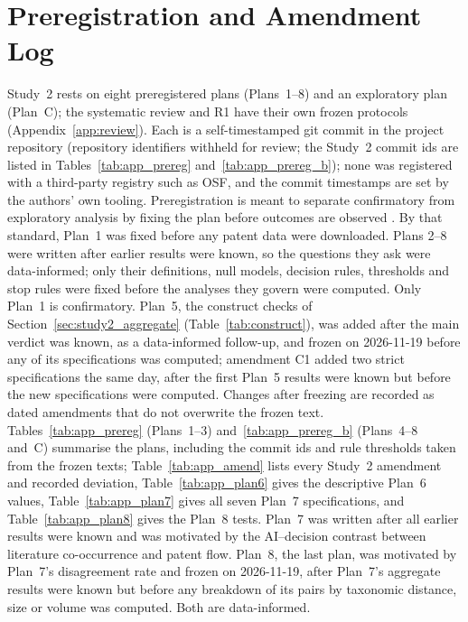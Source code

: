 
\section{Preregistration and Amendment Log}
\label{app:prereg}

Study~2 rests on eight preregistered plans (Plans~1--8) and an exploratory plan (Plan~C); the systematic review and R1 have their own frozen protocols (Appendix~\ref{app:review}). Each is a self-timestamped git commit in the project repository (repository identifiers withheld for review; the Study~2 commit ids are listed in Tables~\ref{tab:app_prereg} and~\ref{tab:app_prereg_b}); none was registered with a third-party registry such as OSF, and the commit timestamps are set by the authors' own tooling. Preregistration is meant to separate confirmatory from exploratory analysis by fixing the plan before outcomes are observed \citep{nosek2018preregistration}. By that standard, Plan~1 was fixed before any patent data were downloaded. Plans 2--8 were written after earlier results were known, so the questions they ask were data-informed; only their definitions, null models, decision rules, thresholds and stop rules were fixed before the analyses they govern were computed. Only Plan~1 is confirmatory. Plan~5, the construct checks of Section~\ref{sec:study2_aggregate} (Table~\ref{tab:construct}), was added after the main verdict was known, as a data-informed follow-up, and frozen on 2026-11-19 before any of its specifications was computed; amendment C1 added two strict specifications the same day, after the first Plan~5 results were known but before the new specifications were computed. Changes after freezing are recorded as dated amendments that do not overwrite the frozen text. Tables~\ref{tab:app_prereg} (Plans~1--3) and~\ref{tab:app_prereg_b} (Plans~4--8 and~C) summarise the plans, including the commit ids and rule thresholds taken from the frozen texts; Table~\ref{tab:app_amend} lists every Study~2 amendment and recorded deviation, Table~\ref{tab:app_plan6} gives the descriptive Plan~6 values, Table~\ref{tab:app_plan7} gives all seven Plan~7 specifications, and Table~\ref{tab:app_plan8} gives the Plan~8 tests. Plan~7 was written after all earlier results were known and was motivated by the AI--decision contrast between literature co-occurrence and patent flow. Plan~8, the last plan, was motivated by Plan~7's disagreement rate and frozen on 2026-11-19, after Plan~7's aggregate results were known but before any breakdown of its pairs by taxonomic distance, size or volume was computed. Both are data-informed.


